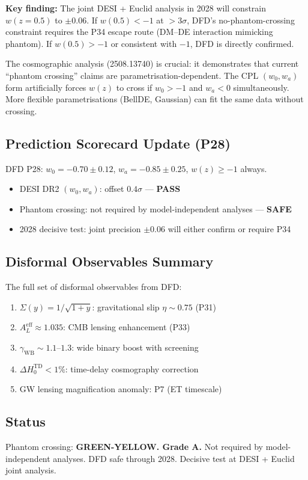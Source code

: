 \documentclass[11pt,a4paper]{article}
\begin{document}
\textbf{Key finding:} The joint DESI + Euclid analysis in 2028 will constrain $w(z=0.5)$ to $\pm 0.06$. If $w(0.5) < -1$ at $>3\sigma$, DFD's no-phantom-crossing constraint requires the P34 escape route (DM--DE interaction mimicking phantom). If $w(0.5) > -1$ or consistent with $-1$, DFD is directly confirmed.

The cosmographic analysis (2508.13740) is crucial: it demonstrates that current ``phantom crossing'' claims are parametrisation-dependent. The CPL $(w_0, w_a)$ form artificially forces $w(z)$ to cross if $w_0 > -1$ and $w_a < 0$ simultaneously. More flexible parametrisations (BellDE, Gaussian) can fit the same data without crossing.

\subsection{Prediction Scorecard Update (P28)}

DFD P28: $w_0 = -0.70 \pm 0.12$, $w_a = -0.85 \pm 0.25$, $w(z) \geq -1$ always.

\begin{itemize}
\item DESI DR2 $(w_0, w_a)$: offset $0.4\sigma$ --- \textbf{PASS}
\item Phantom crossing: not required by model-independent analyses --- \textbf{SAFE}
\item 2028 decisive test: joint precision $\pm 0.06$ will either confirm or require P34
\end{itemize}

\subsection{Disformal Observables Summary}

The full set of disformal observables from DFD:
\begin{enumerate}
\item $\Sigma(y) = 1/\sqrt{1+y}$: gravitational slip $\eta \sim 0.75$ (P31)
\item $A_L^\mathrm{eff} \approx 1.035$: CMB lensing enhancement (P33)
\item $\gamma_\mathrm{WB} \sim 1.1$--$1.3$: wide binary boost with screening
\item $\Delta H_0^\mathrm{TD} < 1\%$: time-delay cosmography correction
\item GW lensing magnification anomaly: P7 (ET timescale)
\end{enumerate}

\subsection{Status}
Phantom crossing: \textbf{GREEN-YELLOW. Grade A.} Not required by model-independent analyses. DFD safe through 2028. Decisive test at DESI + Euclid joint analysis.
\end{document}
